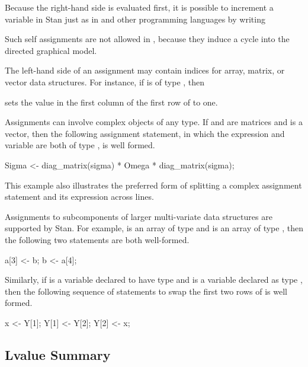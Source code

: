 Because the right-hand side is evaluated first, it is possible to
increment a variable in Stan just as in \Cpp and other programming
languages by writing
%
\begin{quote}
\end{quote}
%
Such self assignments are not allowed in \BUGS, because they induce a
cycle into the directed graphical model.

The left-hand side of an assignment may contain indices for array,
matrix, or vector data structures.  For instance, if  is
of type , then
%
\begin{quote}
\end{quote}
%
sets the value in the first column of the first row of  to one.

Assignments can involve complex objects of any type.  If 
and  are matrices and  is a vector, then the
following assignment statement, in which the expression and variable
are both of type , is well formed.
%
\begin{stancode}
Sigma
  <- diag_matrix(sigma)
     * Omega
     * diag_matrix(sigma);
\end{stancode}
%
This example also illustrates the preferred form of splitting a
complex assignment statement and its expression across lines.

Assignments to subcomponents of larger multi-variate data structures
are supported by Stan.  For example,  is an array of type
 and  is an array of type , then
the following two statements are both well-formed.
%
\begin{stancode}
a[3] <- b;
b <- a[4];
\end{stancode}
%
Similarly, if  is a variable declared to have type
 and  is a variable declared as type
, then the following sequence of statements to swap the
first two rows of  is well formed.
%
\begin{stancode}
x <- Y[1];
Y[1] <- Y[2];
Y[2] <- x;
\end{stancode}
%

\subsection{Lvalue Summary}

